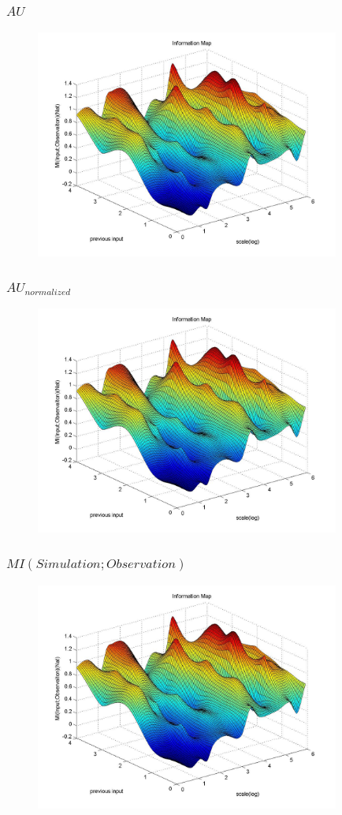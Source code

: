 \documentclass{beamer}
\begin{document}
\begin{CJK}{UTF8}{gkai}
\begin{frame}
\frametitle{$AU $}
\begin{figure}[htbp]
\centering
\includegraphics[width=10cm]{1.jpg}
\end{figure} 
\end{frame}

\begin{frame}
\frametitle{$AU_{normalized} $}
\begin{figure}[htbp]
\centering
\includegraphics[width=10cm]{1.jpg}
\end{figure} 
\end{frame}

\begin{frame}
\frametitle{$MI(Simulation;Observation)$}
\begin{figure}[htbp]
\centering
\includegraphics[width=10cm]{1.jpg}
\end{figure} 
\end{frame}


\end{CJK}
\end{document}
